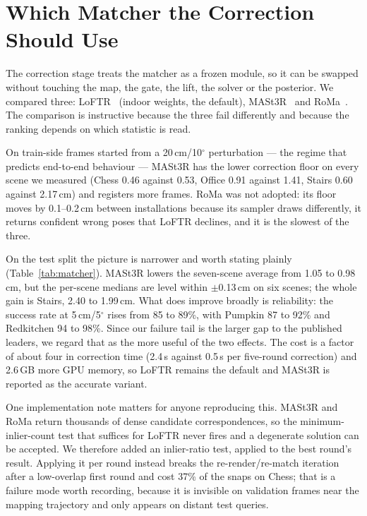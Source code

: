 \documentclass[journal]{IEEEtran}
\begin{document}
\section{Which Matcher the Correction Should Use}
\label{sec:matcher}
The correction stage treats the matcher as a frozen module, so it can be
swapped without touching the map, the gate, the lift, the solver or the
posterior. We compared three: LoFTR~\cite{loftr} (indoor weights, the
default), MASt3R~\cite{mast3r} and RoMa~\cite{roma}. The comparison is
instructive because the three fail differently and because the ranking
depends on which statistic is read.

On train-side frames started from a 20\,cm/10$^\circ$ perturbation --- the
regime that predicts end-to-end behaviour --- MASt3R has the lower
correction floor on every scene we measured (Chess 0.46 against 0.53,
Office 0.91 against 1.41, Stairs 0.60 against 2.17\,cm) and registers more
frames. RoMa was not adopted: its floor moves by 0.1--0.2\,cm between
installations because its sampler draws differently, it returns confident
wrong poses that LoFTR declines, and it is the slowest of the three.

On the test split the picture is narrower and worth stating plainly
(Table~\ref{tab:matcher}). MASt3R lowers the seven-scene average from 1.05
to 0.98\,cm, but the per-scene medians are level within $\pm$0.13\,cm on six
scenes; the whole gain is Stairs, 2.40 to 1.99\,cm. What does improve
broadly is reliability: the success rate at 5\,cm/5$^\circ$ rises from 85 to
89\%, with Pumpkin 87 to 92\% and Redkitchen 94 to 98\%. Since our failure
tail is the larger gap to the published leaders, we regard that as the more
useful of the two effects. The cost is a factor of about four in correction
time (2.4\,s against 0.5\,s per five-round correction) and 2.6\,GB more GPU
memory, so LoFTR remains the default and MASt3R is reported as the accurate
variant.

One implementation note matters for anyone reproducing this. MASt3R and RoMa
return thousands of dense candidate correspondences, so the
minimum-inlier-count test that suffices for LoFTR never fires and a
degenerate solution can be accepted. We therefore added an inlier-ratio
test, applied to the best round's result. Applying it per round instead
breaks the re-render/re-match iteration after a low-overlap first round and
cost 37\% of the snaps on Chess; that is a failure mode worth recording,
because it is invisible on validation frames near the mapping trajectory
and only appears on distant test queries.
\end{document}
